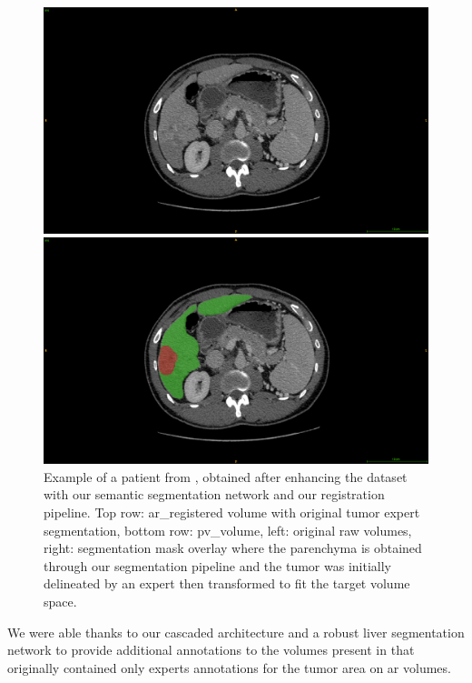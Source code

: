 \begin{figure}[ht!]
\vspace{0.8cm}
\begin{minipage}{0.45\linewidth}
\includegraphics[width=0.9\linewidth]{./images/GDB/GDB_Pat77_slice261_raw_PV}
\end{minipage}
\hspace{0.3cm}
\begin{minipage}{0.45\linewidth}
\includegraphics[width=0.9\linewidth]{./images/GDB/GDB_Pat77_slice261_PV_liverTumorPred}
\end{minipage}
\caption{Example of a patient from , obtained after enhancing the dataset with our semantic segmentation network and our registration pipeline. Top row: \ac{ar}\_registered volume with original tumor expert segmentation, bottom row: \ac{pv}\_volume, left: original raw volumes, right: segmentation mask overlay where the parenchyma is obtained through our segmentation pipeline and the tumor was initially delineated by an expert then transformed to fit the target volume space.}
\label{fig:gDbRegisteredPatient}
\end{figure}


We were able thanks to our cascaded architecture and a robust liver
segmentation network to provide additional annotations to the volumes present in  that
originally contained only experts annotations for the tumor area on \ac{ar} volumes.


